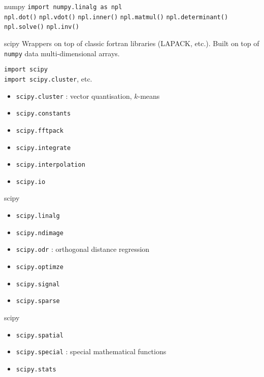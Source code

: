 \begin{frame}{numpy}
  \texttt{import numpy.linalg as npl}\\[2mm]
  \texttt{npl.dot()}
  \texttt{npl.vdot()}
  \texttt{npl.inner()}
  \texttt{npl.matmul()}
  \texttt{npl.determinant()}
  \texttt{npl.solve()}
  \texttt{npl.inv()}
\end{frame}

\begin{frame}{scipy}
  Wrappers on top of classic fortran libraries (LAPACK, etc.).  Built
  on top of \texttt{numpy} data multi-dimensional arrays.
  
  \texttt{import scipy}\\
  \texttt{import scipy.cluster}, etc.

  \begin{itemize}
  \item \texttt{scipy.cluster} : vector quantisation, $k$-means
  \item \texttt{scipy.constants}
  \item \texttt{scipy.fftpack}
  \item \texttt{scipy.integrate}
  \item \texttt{scipy.interpolation}
  \item \texttt{scipy.io}
  \end{itemize}
\end{frame}

\begin{frame}{scipy}
  \begin{itemize}
  \item \texttt{scipy.linalg}
  \item \texttt{scipy.ndimage}
  \item \texttt{scipy.odr} : orthogonal distance regression
  \item \texttt{scipy.optimze}
  \item \texttt{scipy.signal}
  \item \texttt{scipy.sparse}
  \end{itemize}
\end{frame}

\begin{frame}{scipy}
  \begin{itemize}
  \item \texttt{scipy.spatial}
  \item \texttt{scipy.special} : special mathematical functions
  \item \texttt{scipy.stats}
  \end{itemize}
\end{frame}

